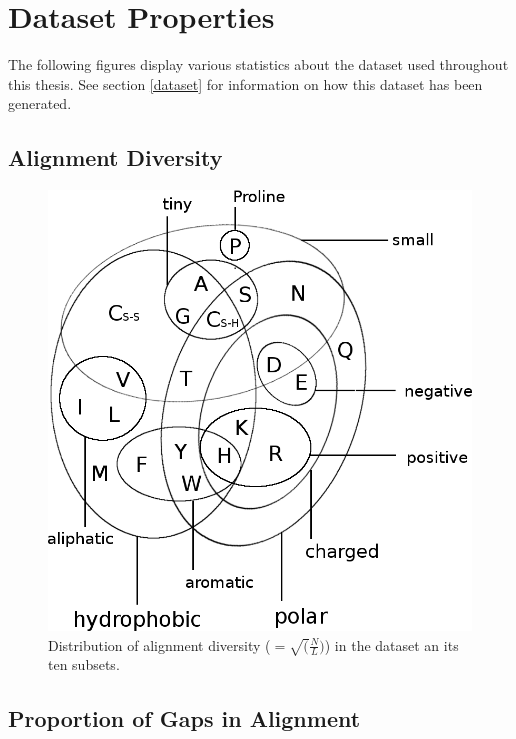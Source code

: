 \documentclass[12pt,a4paper,twoside]{book}
\theoremstyle{definition}
\theoremstyle{definition}
\theoremstyle{remark}
\begin{document}
\chapter{Dataset Properties}\label{dataset-properties}

The following figures display various statistics about the dataset used
throughout this thesis. See section \ref{dataset} for information on how
this dataset has been generated.

\section{Alignment Diversity}\label{alignment-diversity}




\begin{figure}
\includegraphics[width=1\linewidth]{img/amino_acid_physico_chemical_properties_venn_diagramm} \caption{Distribution of alignment diversity
(\(=\sqrt(\frac{N}{L})\)) in the dataset an its ten subsets.}\label{fig:dataset-diversity}
\end{figure}

\section{Proportion of Gaps in
Alignment}\label{proportion-of-gaps-in-alignment}
\end{document}
